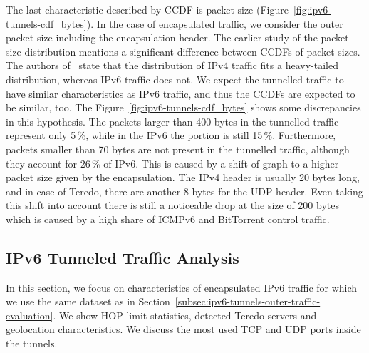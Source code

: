 The last characteristic described by CCDF is packet size (Figure~\ref{fig:ipv6-tunnels-cdf_bytes}). In the case of encapsulated traffic, we consider the outer packet size including the encapsulation header. The earlier study of the packet size distribution mentions a significant difference between CCDFs of packet sizes. The authors of~\cite{Ciflikli-2012-Packet} state that the distribution of IPv4 traffic fits a heavy-tailed distribution, whereas IPv6 traffic does not. We expect the tunnelled traffic to have similar characteristics as IPv6 traffic, and thus the CCDFs are expected to be similar, too. The Figure~\ref{fig:ipv6-tunnels-cdf_bytes} shows some discrepancies in this hypothesis. The packets larger than 400 bytes in the tunnelled traffic represent only 5\,\%, while in the IPv6 the portion is still 15\,\%. Furthermore, packets smaller than 70 bytes are not present in the tunnelled traffic, although they account for 26\,\% of IPv6. This is caused by a shift of graph to a higher packet size given by the encapsulation. The IPv4 header is usually 20 bytes long, and in case of Teredo, there are another 8 bytes for the UDP header. Even taking this shift into account there is still a noticeable drop at the size of 200 bytes which is caused by a high share of ICMPv6 and BitTorrent control traffic.


\subsection{IPv6 Tunneled Traffic Analysis} \label{subsec:ipv6-tunnels-inner-traffic-evaluation}

In this section, we focus on characteristics of encapsulated IPv6 traffic for which we use the same dataset as in Section~\ref{subsec:ipv6-tunnels-outer-traffic-evaluation}. We show HOP limit statistics, detected Teredo servers and geolocation characteristics. We discuss the most used TCP and UDP ports inside the tunnels.

